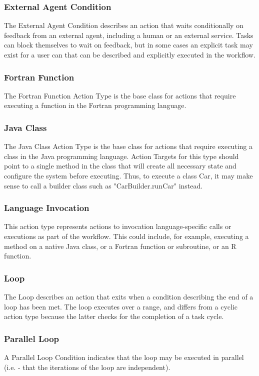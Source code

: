 			\subsubsection{
			External Agent Condition
			}
			The External Agent Condition describes an action that waits conditionally on feedback from an external agent, including a human or an external service. Tasks can block themselves to wait on feedback, but in some cases an explicit task may exist for a user can that can be described and explicitly executed in the workflow.
			\subsubsection{
			Fortran Function
			}
			The Fortran Function Action Type is the base class for actions that require executing a function in the Fortran programming language.
			\subsubsection{
			Java Class
			}
			The Java Class Action Type is the base class for actions that require executing a class in the Java programming language. Action Targets for this type should point to a single method in the class that will create all necessary state and configure the system before executing. Thus, to execute a class Car, it may make sense to call a builder class such as "CarBuilder.runCar" instead.
			\subsubsection{
			Language Invocation
			}
			This action type represents actions to invocation language-specific calls or executions as part of the workflow. This could include, for example, executing a method on a native Java class, or a Fortran function or subroutine, or an R function.
			\subsubsection{
			Loop
			}
			The Loop describes an action that exits when a condition describing the end of a loop has been met. The loop executes over a range, and differs from a cyclic action type because the latter checks for the completion of a task cycle.
			\subsubsection{
			Parallel Loop
			}
			A Parallel Loop Condition indicates that the loop may be executed in parallel (i.e. - that the iterations of the loop are independent).
